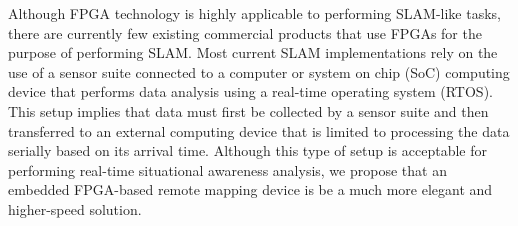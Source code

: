 \par
Although FPGA technology is highly applicable to performing SLAM-like tasks, there are currently few existing commercial products that use FPGAs for the purpose of performing SLAM. Most current SLAM implementations rely on the use of a sensor suite connected to a computer or system on chip (SoC) computing device that performs data analysis using a real-time operating system (RTOS). This setup implies that data must first be collected by a sensor suite and then transferred to an external computing device that is limited to processing the data serially based on its arrival time. Although this type of setup is acceptable for performing real-time situational awareness analysis, we propose that an embedded FPGA-based remote mapping device is be a much more elegant and higher-speed solution.